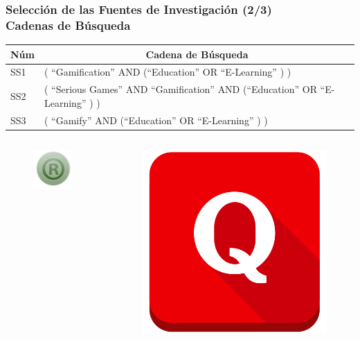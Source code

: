 \documentclass{beamer}
\begin{document}
\begin{frame}
	\frametitle{Selección de las Fuentes de Investigación (2/3)\\ Cadenas de Búsqueda}
	\begin{table}
		\begin{center}
			\begin{tabular}{| l | p{10cm} |}
				\hline
				\multicolumn{1}{|c|}{\textbf{Núm}} & \multicolumn{1}{|c|}{\textbf{Cadena de Búsqueda}} \\
				\hline
				SS1 & ( ``Gamification''{ }AND (``Education''{ }OR ``E-Learning''{ }) )\\
				\hline
				SS2 & ( ``Serious Games''{ }AND ``Gamification''{ }AND (``Education''{ }OR ``E-Learning''{ }) )\\
				\hline            
				SS3 & ( ``Gamify''{ }AND (``Education''{ }OR ``E-Learning''{ }) )\\
				\hline
			\end{tabular}
		\end{center}
	\end{table}
	    \begin{columns}[c]
	    	\begin{figure}
	    		\begin{center}
	    			\includegraphics[scale=.5]{images/2icons/r.png}
	    		\end{center}
	    	\end{figure}
	    	\begin{figure}
	    		\begin{center}
	    			\includegraphics[scale=0.1]{images/2icons/q.png}

\end{center}
\end{figure}
\end{columns}
\end{frame}
\end{document}
